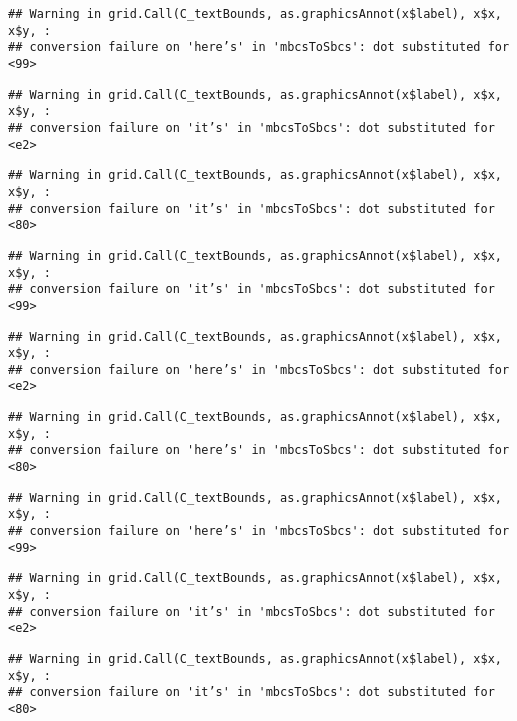 \documentclass[
]{article}
\begin{document}
\begin{verbatim}
## Warning in grid.Call(C_textBounds, as.graphicsAnnot(x$label), x$x, x$y, :
## conversion failure on 'here’s' in 'mbcsToSbcs': dot substituted for <99>
\end{verbatim}

\begin{verbatim}
## Warning in grid.Call(C_textBounds, as.graphicsAnnot(x$label), x$x, x$y, :
## conversion failure on 'it’s' in 'mbcsToSbcs': dot substituted for <e2>
\end{verbatim}

\begin{verbatim}
## Warning in grid.Call(C_textBounds, as.graphicsAnnot(x$label), x$x, x$y, :
## conversion failure on 'it’s' in 'mbcsToSbcs': dot substituted for <80>
\end{verbatim}

\begin{verbatim}
## Warning in grid.Call(C_textBounds, as.graphicsAnnot(x$label), x$x, x$y, :
## conversion failure on 'it’s' in 'mbcsToSbcs': dot substituted for <99>
\end{verbatim}

\begin{verbatim}
## Warning in grid.Call(C_textBounds, as.graphicsAnnot(x$label), x$x, x$y, :
## conversion failure on 'here’s' in 'mbcsToSbcs': dot substituted for <e2>
\end{verbatim}

\begin{verbatim}
## Warning in grid.Call(C_textBounds, as.graphicsAnnot(x$label), x$x, x$y, :
## conversion failure on 'here’s' in 'mbcsToSbcs': dot substituted for <80>
\end{verbatim}

\begin{verbatim}
## Warning in grid.Call(C_textBounds, as.graphicsAnnot(x$label), x$x, x$y, :
## conversion failure on 'here’s' in 'mbcsToSbcs': dot substituted for <99>
\end{verbatim}

\begin{verbatim}
## Warning in grid.Call(C_textBounds, as.graphicsAnnot(x$label), x$x, x$y, :
## conversion failure on 'it’s' in 'mbcsToSbcs': dot substituted for <e2>
\end{verbatim}

\begin{verbatim}
## Warning in grid.Call(C_textBounds, as.graphicsAnnot(x$label), x$x, x$y, :
## conversion failure on 'it’s' in 'mbcsToSbcs': dot substituted for <80>
\end{verbatim}
\end{document}
